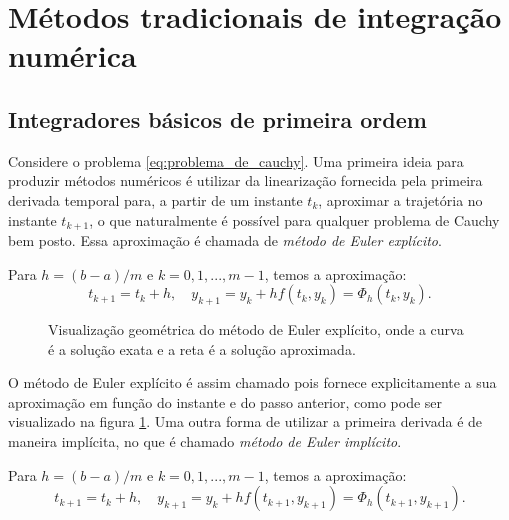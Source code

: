 \section{Métodos tradicionais de integração numérica}
\subsection{Integradores básicos de primeira ordem}

Considere o problema \ref{eq:problema_de_cauchy}. Uma primeira ideia para produzir métodos numéricos é utilizar da linearização fornecida pela primeira derivada temporal para, a partir de um instante $t_k$, aproximar a trajetória no instante $t_{k+1}$, o que naturalmente é possível para qualquer problema de Cauchy bem posto. Essa aproximação é chamada de \textit{método de Euler explícito}.

\begin{method}\label{metodo:euler_explicito}
    Para $h=(b-a)/m$ e $k = 0, 1, ..., m-1$, temos a aproximação:
    \begin{equation*}
        t_{k+1} = t_k + h, \quad
        y_{k+1} = y_k + h f (t_k, y_k) = \Phi_h(t_k, y_k).
    \end{equation*}
\end{method}

\begin{figure}[H]
    \centering
    
    \caption{Visualização geométrica do método de Euler explícito, onde a curva é a solução exata e a reta é a solução aproximada.}
    \label{fig:euler_explicito_grafico}
\end{figure}

O método de Euler explícito é assim chamado pois fornece explicitamente a sua aproximação em função do instante e do passo anterior, como pode ser visualizado na figura \ref{fig:euler_explicito_grafico}. Uma outra forma de utilizar a primeira derivada é de maneira implícita, no que é chamado \textit{método de Euler implícito}.

\begin{method}\label{metodo:euler_implicito}
    Para $h=(b-a)/m$ e $k = 0, 1, ..., m-1$, temos a aproximação:
    \begin{equation*}
        t_{k+1} = t_k + h, \quad
        y_{k+1} = y_k + h f (t_{k+1}, y_{k+1}) = \Phi_h(t_{k+1}, y_{k+1}).
    \end{equation*}
\end{method}

